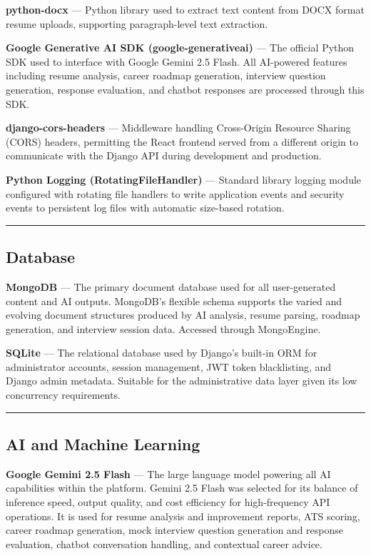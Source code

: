 \documentclass[12pt]{article}
\begin{document}
\textbf{python-docx} --- Python library used to extract text content from DOCX format resume uploads, supporting paragraph-level text extraction.

\textbf{Google Generative AI SDK (google-generativeai)} --- The official Python SDK used to interface with Google Gemini 2.5 Flash. All AI-powered features including resume analysis, career roadmap generation, interview question generation, response evaluation, and chatbot responses are processed through this SDK.

\textbf{django-cors-headers} --- Middleware handling Cross-Origin Resource Sharing (CORS) headers, permitting the React frontend served from a different origin to communicate with the Django API during development and production.

\textbf{Python Logging (RotatingFileHandler)} --- Standard library logging module configured with rotating file handlers to write application events and security events to persistent log files with automatic size-based rotation.

\noindent\rule{\textwidth}{0.4pt}

\subsection{Database}

\textbf{MongoDB} --- The primary document database used for all user-generated content and AI outputs. MongoDB's flexible schema supports the varied and evolving document structures produced by AI analysis, resume parsing, roadmap generation, and interview session data. Accessed through MongoEngine.

\textbf{SQLite} --- The relational database used by Django's built-in ORM for administrator accounts, session management, JWT token blacklisting, and Django admin metadata. Suitable for the administrative data layer given its low concurrency requirements.

\noindent\rule{\textwidth}{0.4pt}

\subsection{AI and Machine Learning}

\textbf{Google Gemini 2.5 Flash} --- The large language model powering all AI capabilities within the platform. Gemini 2.5 Flash was selected for its balance of inference speed, output quality, and cost efficiency for high-frequency API operations. It is used for resume analysis and improvement reports, ATS scoring, career roadmap generation, mock interview question generation and response evaluation, chatbot conversation handling, and contextual career advice.
\end{document}
